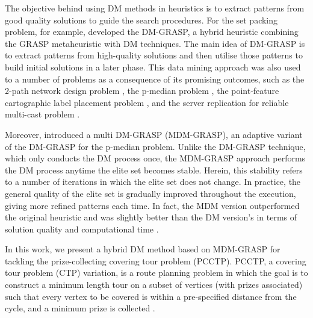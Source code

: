 \documentclass{singlecol-new}
\begin{document}
The objective behind using DM methods in heuristics is to extract patterns from good quality solutions to guide the search procedures. For the set packing problem, for example, \citet{ribeiro06} developed the DM-GRASP, a hybrid heuristic combining the GRASP metaheuristic with DM techniques. The main idea of DM-GRASP is to extract patterns from high-quality solutions and then utilise those patterns to build initial solutions in a later phase. This data mining approach was also used to a number of problems as a consequence of its promising outcomes, such as the 2-path network design problem \cite{barbalho2013}, the p-median problem \cite{plastino2011hybrid}, the point‐feature cartographic label placement problem \cite{guerine2020hybrid}, and the server replication for reliable multi-cast problem \cite{santos2006ngl01}.

Moreover, \citet{plastino2011hybrid} introduced a multi DM-GRASP (MDM-GRASP), an adaptive variant of the DM-GRASP for the p-median problem. Unlike the DM-GRASP technique, which only conducts the DM process once, the MDM-GRASP approach performs the DM process anytime the  elite set becomes stable. Herein, this stability refers to a number of iterations in which the elite set does not change. In practice, the general quality of the elite set is gradually improved throughout the execution, giving more refined patterns each time. In fact, the MDM version outperformed the original heuristic and was slightly better than the DM version's in terms of solution quality and computational time \cite{plastino2014adaptive}.

In this work, we present a hybrid DM method based on MDM-GRASP for tackling the prize-collecting covering tour problem (PCCTP). PCCTP, a covering tour problem (CTP) \cite{gendreau1997covering} variation, is a route planning problem in which the goal is to construct a minimum length tour on a subset of vertices (with prizes associated) such that every vertex to be covered is within a pre-specified distance from the cycle, and a minimum prize is collected \cite{gendreau1997covering}.

\end{document}
